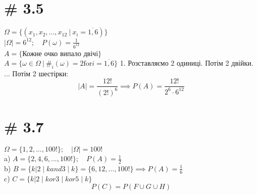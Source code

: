 \documentclass[11pt]{article} %
\begin{document}
\section{# 3.5}
$\Omega = \{(x_1, x_2, ..., x_{12}\:|\: x_i = \overline{1,6})\}$ \\
$|\Omega| = 6^{12};\quad P(\omega) = \frac{1}{6^{12}}$ \\
$A = \{$Кожне очко випало двічі$\}$ \\
$A = \{\omega \in \Omega \:|\: \#_i(\omega)=2 \text{for} i=\overline{1,6} \}$
1. Розставляємо 2 одиниці. Потім 2 двійки. ... Потім 2 шестірки: \\
$$|A| = \frac{12!}{(2!)^6} \implies P(A) = \frac{12!}{2^6 \cdot 6^{12}}$$

\section{# 3.7}
$\Omega = \{1, 2, ..., 100!\}; \quad |\Omega| = 100!$ \\
a) $A = \{2, 4, 6, ..., 100!\}; \quad P(A) = \frac{1}{2}$ \\
b) $B = \{k | 2\mid k and 3\mid k\} = \{6, 12, ..., 100!\} \implies P(A) = \frac{1}{6}$\\
c) $C = \{k | 2\mid k or 3\mid k or 5\mid k \}$
$$ P(C) = P(F \cup G \cup H) $$
\end{document}
